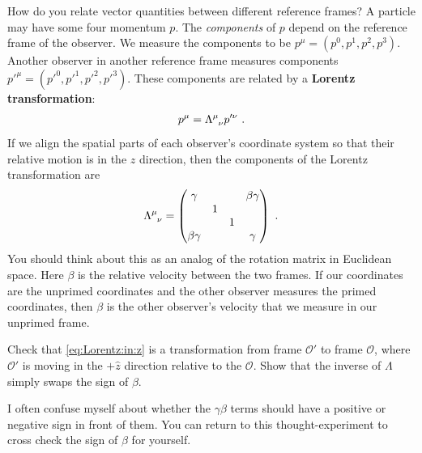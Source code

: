 \documentclass[12pt, oneside]{report}    %
\begin{document}
How do you relate vector quantities between different reference frames? A particle may have some four momentum $p$. The \emph{components} of $p$ depend on the reference frame of the observer. We measure the components to be $p^\mu = (p^0, p^1, p^2, p^3)$. Another observer in another reference frame measures components $p'^\mu=(p'^0, p'^1, p'^2, p'^3)$. These components are related by a \textbf{Lorentz transformation}:
\begin{align}
    p^\mu = \Lambda\aij{\mu}{\nu}p'^\nu \ .
\end{align}
If we align the spatial parts of each observer's coordinate system so that their relative motion is in the $z$ direction, then the components of the Lorentz transformation are
\begin{align}
    \Lambda\aij{\mu}{\nu} =
    \begin{pmatrix}
        \gamma & & & \beta\gamma\\
        & 1 & &  \\
        & & 1 &  \\
        \beta\gamma &  &  & \gamma
    \end{pmatrix}
    \ . 
    \label{eq:Lorentz:in:z}
\end{align}
You should think about this as an analog of the rotation matrix in Euclidean space. Here $\beta$ is the relative velocity between the two frames. If our coordinates are the unprimed coordinates and the other observer measures the primed coordinates, then $\beta$ is the other observer's velocity that we measure in our unprimed frame. 
\begin{exercise}
Check that \eqref{eq:Lorentz:in:z} is a transformation from frame $\mathcal O'$
 to frame $\mathcal O$, where $\mathcal O'$ is moving in the $+\hat{z}$ direction relative to the $\mathcal O$. Show that the inverse of $\Lambda$ simply swaps the sign of $\beta$. 

I often confuse myself about whether the $\gamma \beta$ terms should have a positive or negative sign in front of them. You can return to this thought-experiment to cross check  the sign of $\beta$ for yourself.
\end{exercise}
\end{document}
